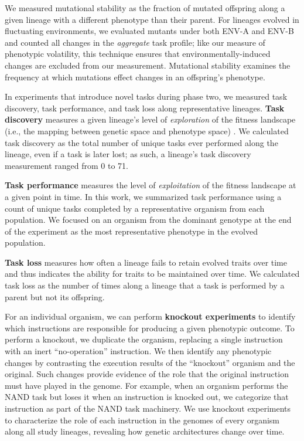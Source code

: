 We measured mutational stability as the fraction of mutated offspring along a given lineage with a different phenotype than their parent.
For lineages evolved in fluctuating environments, we evaluated mutants under both ENV-A and ENV-B and counted all changes in the \textit{aggregate} task profile; like our measure of phenotypic volatility, this technique ensures that environmentally-induced changes are excluded from our measurement.
Mutational stability examines the frequency at which mutations effect changes in an offspring's phenotype.
 
In experiments that introduce novel tasks during phase two, we measured task discovery, task performance, and task loss along representative lineages.
\textbf{Task discovery} measures a given lineage's level of \textit{exploration} of the fitness landscape (i.e., the mapping between genetic space and phenotype space) \citep{canino-koning_fluctuating_2019}. 
We calculated task discovery as the total number of unique tasks ever performed along the lineage, even if a task is later lost; as such, a lineage's task discovery measurement ranged from 0 to 71.

\textbf{Task performance} measures the level of \textit{exploitation} of the fitness landscape at a given point in time.
In this work, we summarized task performance using a count of unique tasks completed by a representative organism from each population.
We focused on an organism from the dominant genotype at the end of the experiment as the most representative phenotype in the evolved population.

\textbf{Task loss} measures how often a lineage fails to retain evolved traits over time and thus indicates the ability for traits to be maintained over time.
We calculated task loss as the number of times along a lineage that a task is performed by a parent but not its offspring. 



For an individual organism, we can perform \textbf{knockout experiments} to identify which instructions are responsible for producing a given phenotypic outcome.
To perform a knockout, we duplicate the organism, replacing a single instruction with an inert ``no-operation'' instruction.
We then identify any phenotypic changes by contrasting the execution results of the ``knockout'' organism and the original.
Such changes provide evidence of the role that the original instruction must have played in the genome.
For example, when an organism performs the NAND task but loses it when an instruction is knocked out, we categorize that instruction as part of the NAND task machinery.
We use knockout experiments to characterize the role of each instruction in the genomes of every organism along all study lineages, revealing how genetic architectures change over time.

